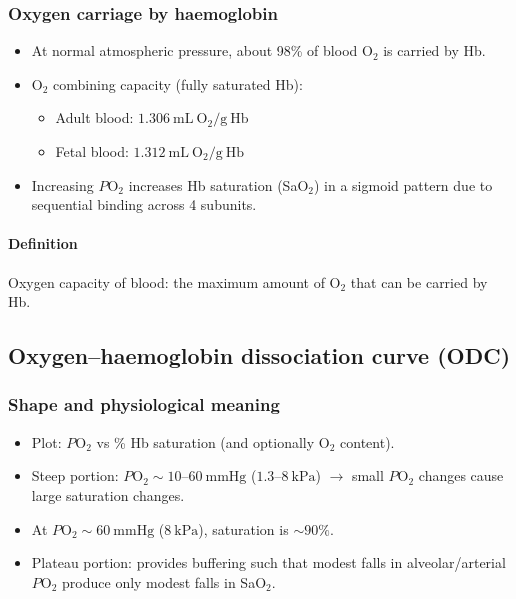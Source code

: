 \documentclass[11pt,a4paper]{article}
\begin{document}
\subsubsection{Oxygen carriage by haemoglobin}
\begin{itemize}
  \item At normal atmospheric pressure, about 98\% of blood O\(_2\) is carried by Hb.
  \item O\(_2\) combining capacity (fully saturated Hb):
  \begin{itemize}
    \item Adult blood: \(1.306~\mathrm{mL~O_2/g~Hb}\)
    \item Fetal blood: \(1.312~\mathrm{mL~O_2/g~Hb}\)
  \end{itemize}
  \item Increasing \(P\mathrm{O}_2\) increases Hb saturation (SaO\(_2\)) in a sigmoid pattern due to sequential binding across 4 subunits.
\end{itemize}

\paragraph{Definition}
Oxygen capacity of blood: the maximum amount of O\(_2\) that can be carried by Hb.

\subsection{Oxygen--haemoglobin dissociation curve (ODC)}

\subsubsection{Shape and physiological meaning}
\begin{itemize}
  \item Plot: \(P\mathrm{O}_2\) vs \% Hb saturation (and optionally O\(_2\) content).
  \item Steep portion: \(P\mathrm{O}_2 \sim 10\text{--}60~\mathrm{mmHg}\) (\(1.3\text{--}8~\mathrm{kPa}\)) \(\rightarrow\) small \(P\mathrm{O}_2\) changes cause large saturation changes.
  \item At \(P\mathrm{O}_2 \sim 60~\mathrm{mmHg}\) (\(8~\mathrm{kPa}\)), saturation is \(\sim 90\%\).
  \item Plateau portion: provides buffering such that modest falls in alveolar/arterial \(P\mathrm{O}_2\) produce only modest falls in SaO\(_2\).
\end{itemize}
\end{document}
